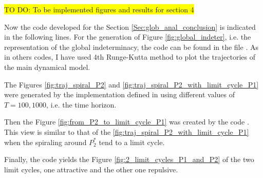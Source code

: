 \colorbox{yellow}{TO DO: To be implemented figures and results for section 4}

Now the code developed for the Section \ref{Sec:glob_anal_conclusion} is indicated in the following lines.
For the generation of Figure \ref{fig:global_indeter}, i.e. the representation of the global indeterminacy, the code can be found in the file . As in others codes, I have used 4th Runge-Kutta method to plot the trajectories of the main dynamical model.

The Figures \ref{fig:traj_spiral_P2} and \ref{fig:traj_spiral_P2_with_limit_cycle_P1} were generated by the implementation defined in  using different values of $T=100,1000$, i.e. the time horizon. 

Then the Figure \ref{fig:from_P2_to_limit_cycle_P1} was created by the code . This view is similar to that of the \ref{fig:traj_spiral_P2_with_limit_cycle_P1} when the spiraling around $P_2^*$ tend to a limit cycle.

Finally, the code  yields the Figure \ref{fig:2_limit_cycles_P1_and_P2} of the two limit cycles, one attractive and the other one repulsive. 